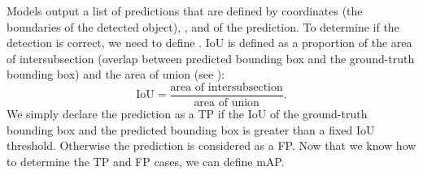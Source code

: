Models output a list of predictions that are defined by 
coordinates (the boundaries of the detected object), , and
 of the prediction. To determine if the detection is
correct, we need to define . IoU is
defined as a proportion of the area of intersubsection (overlap between
predicted bounding box and the ground-truth bounding box) and the area of union
(see ):
$$
    \text{IoU} = \frac{\text{area of intersubsection}}{\text{area of union}}.
$$
We simply declare the prediction as a TP if the IoU of the ground-truth bounding
box and the predicted bounding box is greater than a fixed IoU threshold.
Otherwise the prediction is considered as a FP. Now that we know how to determine
the TP and FP cases, we can define mAP.

